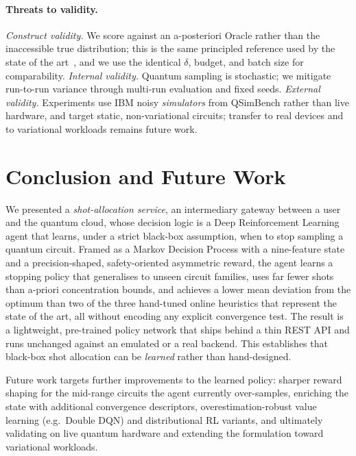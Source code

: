 \documentclass[runningheads]{llncs}
\begin{document}
\paragraph{Threats to validity.} \emph{Construct validity.} We score against an a-posteriori Oracle rather than the
inaccessible true distribution; this is the same principled reference used by the
state of the art~\cite{bisicchia2026shots}, and we use the identical $\delta$,
budget, and batch size for comparability. \emph{Internal validity.} Quantum
sampling is stochastic; we mitigate run-to-run variance through multi-run
evaluation and fixed seeds. \emph{External validity.} Experiments use IBM noisy
\emph{simulators} from QSimBench rather than live hardware, and target static,
non-variational circuits; transfer to real devices and to variational workloads
remains future work.

\section{Conclusion and Future Work}
\label{sec:conclusion}

We presented a \emph{shot-allocation service}, an intermediary gateway between a
user and the quantum cloud, whose decision logic is a Deep Reinforcement Learning
agent that learns, under a strict black-box assumption, when to stop sampling a
quantum circuit. Framed as a Markov Decision Process with a nine-feature state and
a precision-shaped, safety-oriented asymmetric reward, the agent learns a stopping
policy that generalises to unseen circuit families, uses far fewer shots than
a-priori concentration bounds, and achieves a lower mean deviation from the
optimum than two of the three hand-tuned online heuristics that represent the
state of the art, all without encoding any explicit convergence test.
The result is a lightweight, pre-trained policy network that ships behind a thin
REST API and runs unchanged against an emulated or a real backend. This
establishes that black-box shot allocation can be \emph{learned} rather than
hand-designed.

Future work targets further improvements to the learned policy: sharper
reward shaping for the mid-range circuits the agent currently over-samples,
enriching the state with additional convergence descriptors, overestimation-robust
value learning (e.g.\ Double DQN) and distributional RL variants, and ultimately
validating on live quantum hardware and extending the formulation toward
variational workloads.



\end{document}
